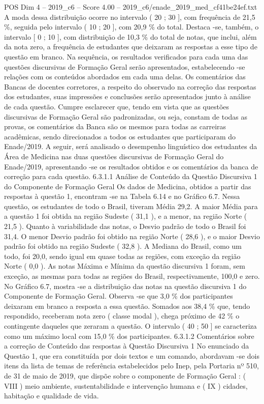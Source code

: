 \begin{textsample}{POS Dim 4 – 2019\_c6 – Score 4.00 – 2019\_c6/enade\_2019\_med\_cf41be24ef.txt}
A moda dessa distribuição ocorre no intervalo ( 20 ; 30 ], com frequência de 21,5 \%, seguida pelo intervalo ( 10 ; 20 ], com 20,9 \% do total.
Destaca -se, também, o intervalo [ 0 ; 10 ], com distribuição de 10,3 \% do total de notas, que inclui, além da nota zero, a frequência de estudantes que deixaram as respostas a esse tipo de questão em branco.
Na sequência, os resultados verificados para cada uma das questões discursivas de Formação Geral serão apresentados, estabelecendo -se relações com os conteúdos abordados em cada uma delas.
Os comentários das Bancas de docentes corretores, a respeito do observado na correção das respostas dos estudantes, suas impressões e conclusões serão apresentados junto à análise de cada questão.
Cumpre esclarecer que, tendo em vista que as questões discursivas de Formação Geral são padronizadas, ou seja, constam de todas as provas, os comentários da Banca são os mesmos para todas as carreiras acadêmicas, sendo direcionados a todos os estudantes que participaram do Enade/2019.
A seguir, será analisado o desempenho linguístico dos estudantes da Área de Medicina nas duas questões discursivas de Formação Geral do Enade/2019, apresentando -se os resultados obtidos e os comentários da banca de correção para cada questão. 6.3.1.1 Análise de Conteúdo da Questão Discursiva 1 do Componente de Formação Geral Os dados de Medicina, obtidos a partir das respostas à questão 1, encontram -se na Tabela 6.14 e no Gráfico 6.7.
Nessa questão, os estudantes de todo o Brasil, tiveram Média 29,2.
A maior Média para a questão 1 foi obtida na região Sudeste ( 31,1 ), e a menor, na região Norte ( 21,5 ).
Quanto à variabilidade das notas, o Desvio padrão de todo o Brasil foi 31,4.
O menor Desvio padrão foi obtido na região Norte ( 28,6 ), e o maior Desvio padrão foi obtido na região Sudeste ( 32,8 ).
A Mediana do Brasil, como um todo, foi 20,0, sendo igual em quase todas as regiões, com exceção da região Norte ( 0,0 ).
As notas Máxima e Mínima da questão discursiva 1 foram, sem exceção, as mesmas para todas as regiões do Brasil, respectivamente, 100,0 e zero.
No Gráfico 6.7, mostra -se a distribuição das notas na questão discursiva 1 do Componente de Formação Geral.
Observa -se que 3,0 \% dos participantes deixaram em branco a resposta a essa questão.
Somados aos 38,4 \% que, tendo respondido, receberam nota zero ( classe modal ), chega próximo de 42 \% o contingente daqueles que zeraram a questão.
O intervalo ( 40 ; 50 ] se caracteriza como um máximo local com 15,0 \% dos participantes. 6.3.1.2 Comentários sobre a correção de Conteúdo das respostas à Questão Discursiva 1 No enunciado da Questão 1, que era constituída por dois textos e um comando, abordavam -se dois itens da lista de temas de referência estabelecidos pelo Inep, pela Portaria nº 510, de 31 de maio de 2019, que dispõe sobre o componente de Formação Geral : ( VIII ) meio ambiente, sustentabilidade e intervenção humana e ( IX ) cidades, habitação e qualidade de vida.

\end{textsample}
